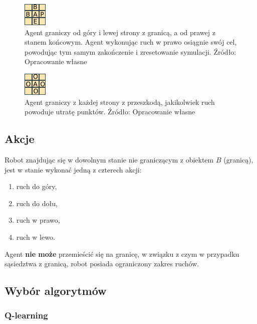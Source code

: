 \begin{figure}[h!]
    \centering
    \includegraphics[scale=10]{grid3}
    \caption{Agent graniczy od góry i lewej strony z granicą, a od prawej z stanem końcowym. Agent wykonując 
ruch w prawo osiągnie swój cel, powodując tym samym zakończenie i zresetowanie symulacji. Źródło: Opracowanie własne}
    \label{fig:grid3}
\end{figure}

\begin{figure}[h!]
    \centering
    \includegraphics[scale=10]{grid4}
    \caption{Agent graniczy z każdej strony z przeszkodą, jakikolwiek ruch powoduje utratę punktów. Źródło: 
Opracowanie własne}
    \label{fig:grid4}
\end{figure}

\subsection{Akcje}
\label{subsec:akcje}

Robot znajdując się w dowolnym stanie nie graniczącym z obiektem $B$ (granicą), jest w stanie wykonać jedną z czterech 
akcji:

\begin{enumerate}
 \item ruch do góry,
 \item ruch do dołu,
 \item ruch w prawo,
 \item ruch w lewo.
\end{enumerate}

Agent \textbf{nie może} przemieścić się na granicę, w związku z czym w przypadku sąsiedztwa z granicą, robot posiada 
ograniczony zakres ruchów. 

\subsection{Wybór algorytmów}
\label{subsec:wyboralgorytmow}



\subsubsection{Q-learning}
\label{subsubsec:qlearning}

